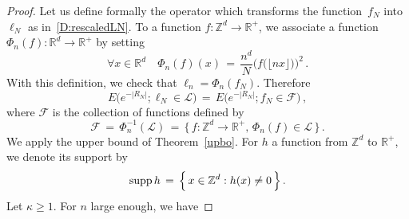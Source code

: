 \documentclass[AHL, Unicode, longabstracts, published]{cedram}
\newcommand*\supp{\text{supp\,}}
\newcommand*\Zd {{\mathbb Z^d}}
\newcommand*\Rd {{\mathbb R^d}}
\newcommand*\R{\mathbb{R}}
\newcommand{\cF}{\mathcal{F}}
\newcommand{\cL}{\mathcal{L}}
\let\oldforall\forall
\renewcommand*{\forall}{\mathrel{\oldforall}}
\begin{document}
\begin{proof}
Let us define formally the operator which transforms the function~$f_N$ into $\ell_N$ as in~\eqref{D:rescaledLN}. To a function $f:\Zd\to\R^+$, we associate a function $\Phi_n(f):\Rd\to\R^+$ by setting
\begin{equation}\label{E:rescale_op}
\forall x\in\Rd\quad \Phi_n(f)(x)\,=\,
\frac{n^d}{N}{\Big(f\big(\lfloor nx\rfloor\big)\Big)^2}\,.
\end{equation}
With this definition, we check that $\ell_n=\Phi_n(f_N)$. Therefore
\[
E\Big(e^{-|R_N|};
\ell_N\in\cL\Big)\,=\, E\Big(e^{-|R_N|}; f_N\in\cF\Big)\,,
\]
where $\cF$ is the collection of functions defined by
\[
\cF\,=\,
\Phi_n^{-1}(\cL)
\,=\,
\big\{\,f:\Zd\to\R^+, \,\Phi_n(f)\in\cL\,\big\}\,.
\]
We apply the upper bound of Theorem~\ref{upbo}. For $h$ a function from $\Zd$ to $\R^+$, we denote its support by
\[
\supp h\,=\,
\Big\{\,x\in \Zd: h(x)\neq 0
\,\Big\}\,.
\]
Let $\kappa\geq 1$. For $n$ large enough, we have


\end{proof}
\end{document}
